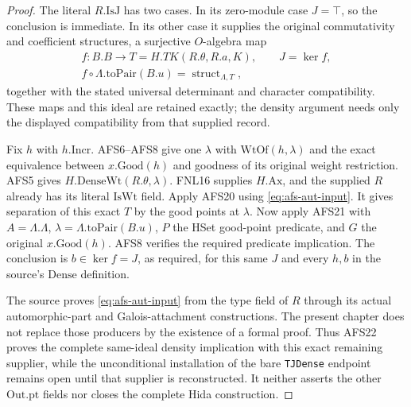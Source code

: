 \begin{proof}
The literal $R.\mathrm{IsJ}$ has two cases.  In its
zero-module case $J=\top$, so the conclusion is immediate.
In its other case it supplies the original commutativity
and coefficient structures, a surjective $O$-algebra map
\begin{gather*}
 f:B.B\longrightarrow T=H.TK(R.\theta,R.a,K),\qquad J=\ker f,\\
 f\circ\Lambda.\mathrm{toPair}(B.u)
                          =\operatorname{struct}_{\Lambda,T},
\end{gather*}
together with the stated universal determinant and
character compatibility.  These maps and this ideal
are retained exactly; the density argument needs only
the displayed compatibility from that supplied record.

Fix $h$ with $h.\mathrm{Incr}$.  AFS6--AFS8 give one
$\lambda$ with $\mathrm{WtOf}(h,\lambda)$ and the exact
equivalence between $x.\mathrm{Good}(h)$ and goodness
of its original weight restriction.  AFS5 gives
$H.\mathrm{DenseWt}(R.\theta,\lambda)$.
FNL16 supplies $H.\mathrm{Ax}$, and the supplied $R$
already has its literal $\mathrm{IsWt}$ field.
Apply AFS20 using \eqref{eq:afs-aut-input}.  It gives
separation of this exact $T$ by the good points at
$\lambda$.  Now apply AFS21 with
$A=\Lambda.\Lambda$, $\lambda=\Lambda.\mathrm{toPair}(B.u)$,
$P$ the HSet good-point predicate, and $G$ the original
$x.\mathrm{Good}(h)$.  AFS8 verifies the required
predicate implication.  The conclusion is
$b\in\ker f=J$, as required, for this same $J$ and
every $h,b$ in the source's $\mathrm{Dense}$ definition.

The source proves \eqref{eq:afs-aut-input} from the
type field of $R$ through its actual automorphic-part
and Galois-attachment constructions.  The present
chapter does not replace those producers by the
existence of a formal proof.  Thus AFS22 proves the
complete same-ideal density implication with this
exact remaining supplier, while the unconditional
installation of the bare \texttt{TJDense} endpoint
remains open until that supplier is reconstructed.
It neither asserts the other $\mathrm{Out.pt}$ fields
nor closes the complete Hida construction.
\end{proof}
